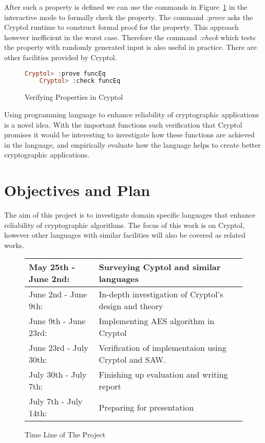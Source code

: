 \documentclass[a4paper, notitlepage]{report}
\begin{document}
After such a property is defined we can use the commands
in Figure~\ref{fig:verify} in the interactive mode to formally check the property. The command \emph{:prove} asks the Cryptol runtime to construct formal
proof for the property. This approach  however inefficient in the worst case.
Therefore the command \emph{:check} which tests the property with randomly
generated input is also useful in practice. There are other facilities provided
by Cryptol.

\begin{figure}[h]
  \begin{lstlisting}[language=Haskell, frame=single]
    Cryptol> :prove funcEq
    Cryptol> :check funcEq
  \end{lstlisting}
  \caption{Verifying Properties in Cryptol}
  \label{fig:verify}
\end{figure}

Using programming language to enhance reliability of cryptographic applications
is a novel idea. With the important functions such verification that Cryptol
promises it would be interesting to investigate how these functions
are achieved in the language, and empirically evaluate how the language
helps to create better cryptographic applications.

\chapter{Objectives and Plan}

The aim of this project is to investigate domain specific languages
that enhance reliability of cryptographic algorithms. The focus of this
work is on Cryptol, however other languages with similar facilities will
also be covered as related works.

\begin{figure}[h]
  \centering
\begin{tabular}{| l | p{5cm} |}
  \hline
  May 25th - June 2nd: & Surveying Cyptol and similar languages \\
  \hline
  June 2nd - June 9th: & In-depth investigation of Cryptol's design and theory \\
  \hline
  June 9th - June 23rd: & Implementing AES algorithm in Cryptol \\
  \hline
  June 23rd - July 30th: & Verification of implementaion using Cryptol and SAW. \\
  \hline
  July 30th - July 7th: & Finishing up evaluation and writing report \\
  \hline
  July 7th - July 14th: & Preparing for presentation \\
  \hline
\end{tabular}
\caption{Time Line of The Project}
\label{fig:time}
\end{figure}
\end{document}
